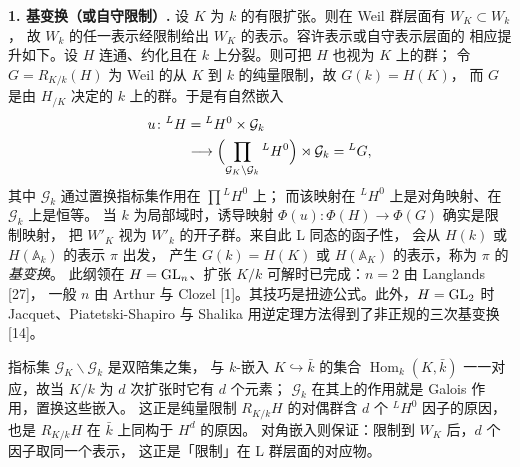 \par\medskip\noindent\textbf{1. 基变换（或自守限制）.}\quad
设 $K$ 为 $k$ 的有限扩张。则在 Weil 群层面有 $W_K\subset W_k$，
故 $W_k$ 的任一表示经限制给出 $W_K$ 的表示。容许表示或自守表示层面的
相应提升如下。设 $H$ 连通、约化且在 $k$ 上分裂。则可把 $H$ 也视为 $K$ 上的群；
令 $G=R_{K/k}(H)$ 为 Weil 的从 $K$ 到 $k$ 的纯量限制，故 $G(k)=H(K)$，
而 $G$ 是由 $H_{/K}$ 决定的 $k$ 上的群。于是有自然嵌入
\[
\begin{aligned}
  u\colon{}^{L}H&={}^{L}H^{0}\times\mathcal{G}_k\\
  &\longrightarrow\Bigl(\prod_{\mathcal{G}_K\backslash\mathcal{G}_k}
  {}^{L}H^{0}\Bigr)\rtimes\mathcal{G}_k={}^{L}G,
\end{aligned}
\]
其中 $\mathcal{G}_k$ 通过置换指标集作用在 $\prod{}^{L}H^{0}$ 上；
而该映射在 ${}^{L}H^{0}$ 上是对角映射、在 $\mathcal{G}_k$ 上是恒等。
当 $k$ 为局部域时，诱导映射 $\Phi(u)\colon\Phi(H)\to\Phi(G)$ 确实是限制映射，
把 $W'_K$ 视为 $W'_k$ 的开子群。来自此 L 同态的函子性，
会从 $H(k)$ 或 $H(\mathbb{A}_k)$ 的表示 $\pi$ 出发，
产生 $G(k)=H(K)$ 或 $H(\mathbb{A}_K)$ 的表示，称为 $\pi$ 的\emph{基变换}。
此纲领在 $H=\mathrm{GL}_n$、扩张 $K/k$ 可解时已完成：$n=2$ 由 Langlands [27]，
一般 $n$ 由 Arthur 与 Clozel [1]。其技巧是扭迹公式。此外，$H=\mathrm{GL}_2$ 时
Jacquet、Piatetski-Shapiro 与 Shalika 用逆定理方法得到了非正规的三次基变换 [14]。
\begin{annote}
指标集 $\mathcal{G}_K\backslash\mathcal{G}_k$ 是双陪集之集，
与 $k$-嵌入 $K\hookrightarrow\bar k$ 的集合 $\operatorname{Hom}_k(K,\bar k)$
一一对应，故当 $K/k$ 为 $d$ 次扩张时它有 $d$ 个元素；
$\mathcal{G}_k$ 在其上的作用就是 Galois 作用，置换这些嵌入。
这正是纯量限制 $R_{K/k}H$ 的对偶群含 $d$ 个 ${}^{L}H^{0}$ 因子的原因，
也是 $R_{K/k}H$ 在 $\bar k$ 上同构于 $H^{d}$ 的原因。
对角嵌入则保证：限制到 $W_K$ 后，$d$ 个因子取同一个表示，
这正是「限制」在 L 群层面的对应物。
\par{}
\end{annote}

